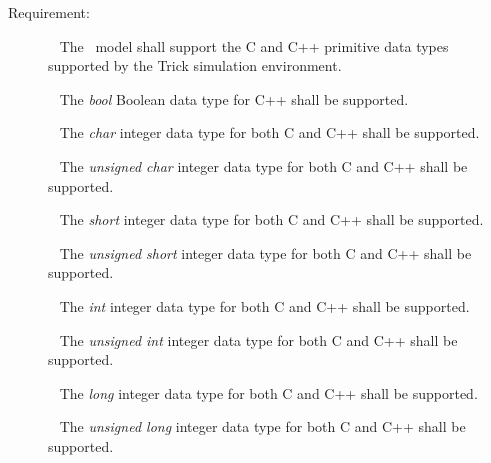 \documentclass[twoside,11pt,titlepage]{report}
\begin{document}
\label{reqt:primitive_data_types}
\begin{description}
  \item[Requirement:]\ \newline
    The \TrickHLA\ model shall support the C and C++ primitive
    data types supported by the Trick simulation environment.

    \label{reqt:primitive_data_types_bool}
      \ \newline
      The {\em bool} Boolean data type for C++ shall be supported.

    \label{reqt:primitive_data_types_char}
      \ \newline
      The {\em char} integer data type for both C and C++
      shall be supported.

    \label{reqt:primitive_data_types_uchar}
      \ \newline
      The {\em unsigned char} integer data type for both C and C++
      shall be supported.

    \label{reqt:primitive_data_types_short}
      \ \newline
      The {\em short} integer data type for both C and C++
      shall be supported.

    \label{reqt:primitive_data_types_ushort}
      \ \newline
      The {\em unsigned short} integer data type for both C and C++
      shall be supported.

    \label{reqt:primitive_data_types_int}
      \ \newline
      The {\em int} integer data type for both C and C++
      shall be supported.

    \label{reqt:primitive_data_types_uint}
      \ \newline
      The {\em unsigned int} integer data type for both C and C++
      shall be supported.

    \label{reqt:primitive_data_types_long}
      \ \newline
      The {\em long} integer data type for both C and C++
      shall be supported.

    \label{reqt:primitive_data_types_ulong}
      \ \newline
      The {\em unsigned long} integer data type for both C and C++
      shall be supported.


\end{description}
\end{document}
